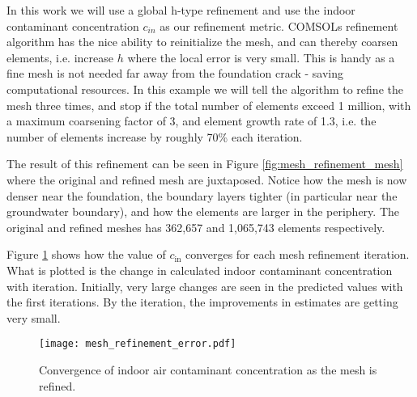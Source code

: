 In this work we will use a global h-type refinement and use the indoor contaminant concentration $c_{in}$ as our refinement metric.
COMSOLs refinement algorithm has the nice ability to reinitialize the mesh, and can thereby coarsen elements, i.e. increase $h$ where the local error is very small.
This is handy as a fine mesh is not needed far away from the foundation crack - saving computational resources.
In this example we will tell the algorithm to refine the mesh three times, and stop if the total number of elements exceed 1 million, with a maximum coarsening factor of 3, and element growth rate of 1.3, i.e. the number of elements increase by roughly 70\% each iteration.\par

The result of this refinement can be seen in Figure \ref{fig:mesh_refinement_mesh} where the original and refined mesh are juxtaposed.
Notice how the mesh is now denser near the foundation, the boundary layers tighter (in particular near the groundwater boundary), and how the elements are larger in the periphery.
The original and refined meshes has 362,657 and 1,065,743 elements respectively.\par
Figure \ref{fig:mesh_refinement} shows how the value of $c_\mathrm{in}$ converges for each mesh refinement iteration.
What is plotted is the change in calculated indoor contaminant concentration with iteration.
Initially, very large changes are seen in the predicted values with the first iterations.
By the  iteration, the improvements in estimates are getting very small.\par

\begin{figure}[htb!]
  \centering
  \texttt{[image: mesh\_refinement\_error.pdf]}
  \caption{Convergence of indoor air contaminant concentration as the mesh is refined.}
  \label{fig:mesh_refinement}
\end{figure}
